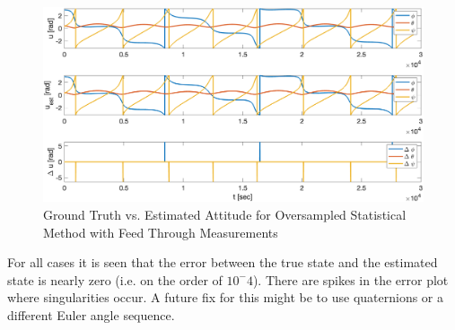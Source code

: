 \begin{figure}[H]
    \centering
    \includegraphics[width = 12cm]{Images/PS6/attitude_estimation_oversampled_q_default.png}
    \caption{Ground Truth vs. Estimated Attitude for Oversampled Statistical Method with Feed Through Measurements}
    \label{fig:stat_attitude_oversampled_default}
\end{figure}

For all cases it is seen that the error between the true state and the estimated state is nearly zero (i.e. on the order of $10^-4$). There are spikes in the error plot where singularities occur. A future fix for this might be to use quaternions or a different Euler angle sequence. 